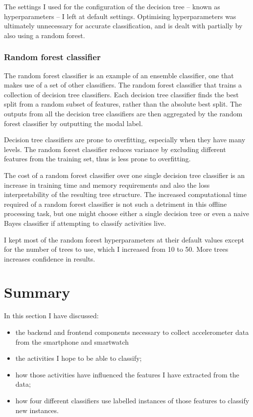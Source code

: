         The settings I used for the configuration of the decision tree -- known as hyperparameters -- I left at default settings. Optimising hyperparameters was ultimately unnecessary for accurate classification, and is dealt with partially by also using a random forest.
        
      \subsubsection{Random forest classifier}
        The random forest classifier is an example of an ensemble classifier, one that makes use of a set of other classifiers. The random forest classifier that trains a collection of decision tree classifiers. Each decision tree classifier finds the best split from a random subset of features, rather than the absolute best split. The outputs from all the decision tree classifiers are then aggregated by the random forest classifier by outputting the modal label.
        
        Decision tree classifiers are prone to overfitting, especially when they have many levels. The random forest classifier reduces variance by excluding different features from the training set, thus is less prone to overfitting.
        
        The cost of a random forest classifier over one single decision tree classifier is an increase in training time and memory requirements and also the loss interpretability of the resulting tree structure. The increased computational time required of a random forest classifier is not such a detriment in this offline processing task, but one might choose either a single decision tree or even a naive Bayes classifier if attempting to classify activities live.
        
        I kept most of the random forest hyperparameters at their default values except for the number of trees to use, which I increased from 10 to 50. More trees increases confidence in results.
  \clearpage
  \section{Summary}
    In this section I have discussed:
    \begin{itemize}
      \item the backend and frontend components necessary to collect accelerometer data from the smartphone and smartwatch
      \item the activities I hope to be able to classify;
      \item how those activities have influenced the features I have extracted from the data;
      \item how four different classifiers use labelled instances of those features to classify new instances.
    \end{itemize}
